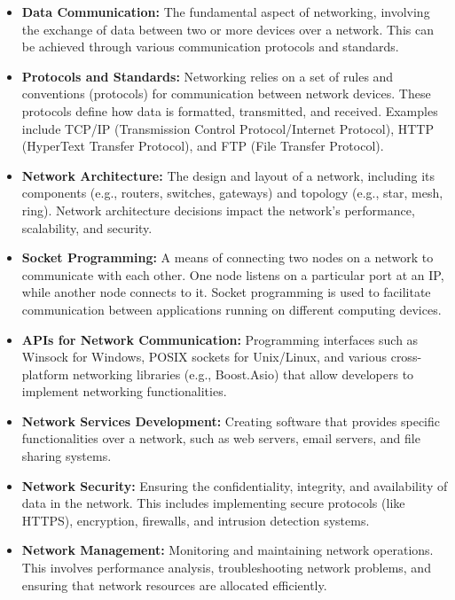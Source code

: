 \documentclass{report}
\begin{document}
    \begin{itemize}
        \item \textbf{Data Communication:} The fundamental aspect of networking, involving the exchange of data between two or more devices over a network. This can be achieved through various communication protocols and standards.
        \item \textbf{Protocols and Standards:} Networking relies on a set of rules and conventions (protocols) for communication between network devices. These protocols define how data is formatted, transmitted, and received. Examples include TCP/IP (Transmission Control Protocol/Internet Protocol), HTTP (HyperText Transfer Protocol), and FTP (File Transfer Protocol).
        \item \textbf{Network Architecture:} The design and layout of a network, including its components (e.g., routers, switches, gateways) and topology (e.g., star, mesh, ring). Network architecture decisions impact the network's performance, scalability, and security.
        \item \textbf{Socket Programming:} A means of connecting two nodes on a network to communicate with each other. One node listens on a particular port at an IP, while another node connects to it. Socket programming is used to facilitate communication between applications running on different computing devices.
        \item \textbf{APIs for Network Communication:} Programming interfaces such as Winsock for Windows, POSIX sockets for Unix/Linux, and various cross-platform networking libraries (e.g., Boost.Asio) that allow developers to implement networking functionalities.
        \item \textbf{Network Services Development:} Creating software that provides specific functionalities over a network, such as web servers, email servers, and file sharing systems.
        \item \textbf{Network Security:} Ensuring the confidentiality, integrity, and availability of data in the network. This includes implementing secure protocols (like HTTPS), encryption, firewalls, and intrusion detection systems.
        \item \textbf{Network Management:} Monitoring and maintaining network operations. This involves performance analysis, troubleshooting network problems, and ensuring that network resources are allocated efficiently.
    \end{itemize}

    \bigbreak \noindent 
\end{document}
